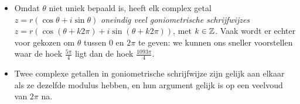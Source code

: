 \documentclass{ximera}
\begin{document}
 
\begin{remark}\nl
     
    \begin{itemize}
        \item Omdat $\theta$ niet uniek bepaald is, heeft elk complex getal $z = r(\cos\theta+i\sin\theta)$ \textit{oneindig veel goniometrische schrijfwijzes} $z = r\left(\cos(\theta+k2\pi)+i\sin(\theta+k2\pi) \right)$, met $k\in\mathbb{Z}$. Vaak wordt er echter voor gekozen om $\theta$ tussen 0 en $2\pi$ te geven: we kunnen ons sneller voorstellen waar de hoek $\frac{5\pi}{4}$ ligt dan de hoek $\frac{1093\pi}{4}$.
        \item Twee complexe getallen in goniometrische schrijfwijze zijn gelijk aan elkaar als ze dezelfde modulus hebben, en hun argument gelijk is op een veelvoud van $2\pi$ na.
    \end{itemize}
     
\end{remark}
\end{document}

